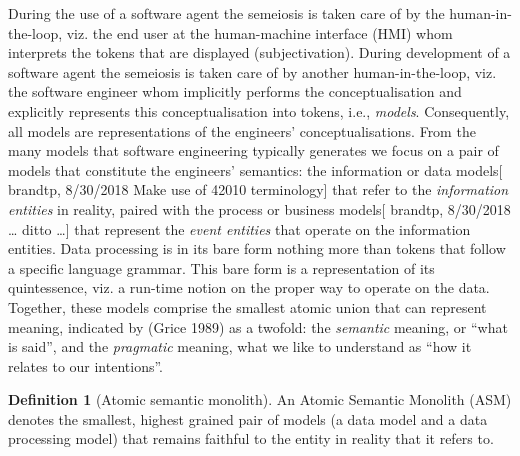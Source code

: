 \documentclass[a4paper,11pt,oneside,oldfontcommands]{memoir}
\theoremstyle{definition}
\theoremstyle{break}		%
\newtheorem{mmdef}{Definition}[chapter]
\numberwithin{equation}{chapter}
\numberwithin{figure}{chapter}
\begin{document}
During the use of a software agent the semeiosis is taken care of by the
human-in-the-loop, viz. the end user at the human-machine interface
(HMI) whom interprets the tokens that are displayed (subjectivation).
During development of a software agent the semeiosis is taken care of by
another human-in-the-loop, viz. the software engineer whom implicitly
performs the conceptualisation and explicitly represents this
conceptualisation into tokens, i.e., \emph{models}. Consequently, all
models are representations of the engineers' conceptualisations. From
the many models that software engineering typically generates we focus
on a pair of models that constitute the engineers' semantics: the
information or data models{[} brandtp, 8/30/2018 Make use of 42010
terminology{]} that refer to the \emph{information entities} in reality,
paired with the process or business models{[} brandtp, 8/30/2018
\ldots{} ditto \ldots{}{]} that represent the \emph{event entities} that
operate on the information entities. Data processing is in its bare form
nothing more than tokens that follow a specific language grammar. This
bare form is a representation of its quintessence, viz. a run-time
notion on the proper way to operate on the data. Together, these models
comprise the smallest atomic union that can represent meaning, indicated
by (Grice 1989) as a twofold: the \emph{semantic} meaning, or ``what is
said'', and the \emph{pragmatic} meaning, what we like to understand as
``how it relates to our intentions''.

\begin{mmdef}[Atomic semantic monolith]\label{def:atomic-semantic-monolith}
An Atomic Semantic Monolith (ASM) denotes the smallest, highest grained pair of models (a data model and a data processing model) that remains faithful to the entity in reality that it refers to.
\end{mmdef}
\end{document}
